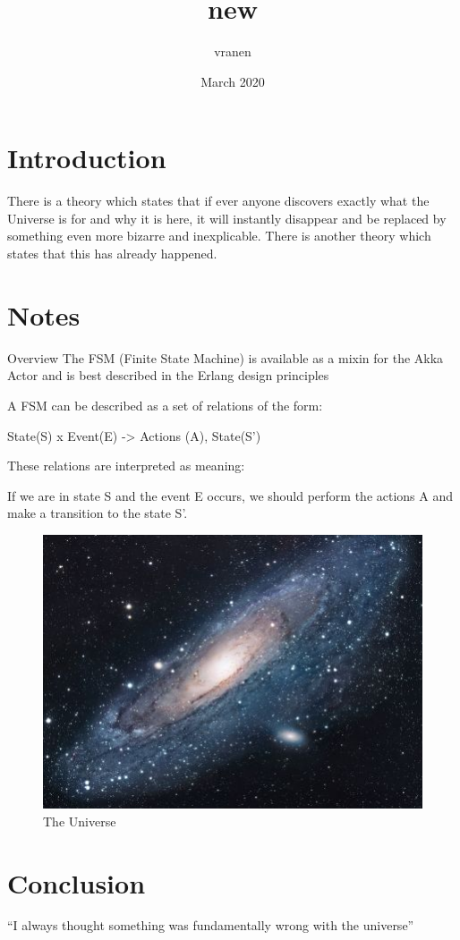 \documentclass{article}
\title{new}
\author{vranen }
\date{March 2020}
\begin{document}
\maketitle

\section{Introduction}
There is a theory which states that if ever anyone discovers exactly what the Universe is for and why it is here, it will instantly disappear and be replaced by something even more bizarre and inexplicable.
There is another theory which states that this has already happened.

\section{Notes}
Overview
The FSM (Finite State Machine) is available as a mixin for the Akka Actor and is best described in the Erlang design principles

A FSM can be described as a set of relations of the form:

State(S) x Event(E) -> Actions (A), State(S’)

These relations are interpreted as meaning:

If we are in state S and the event E occurs, we should perform the actions A and make a transition to the state S’.

\begin{figure}[h!]
\centering
\includegraphics[scale=1.7]{universe}
\caption{The Universe}
\label{fig:universe}
\end{figure}

\section{Conclusion}
``I always thought something was fundamentally wrong with the universe'' \citep{adams1995hitchhiker}



\end{document}
